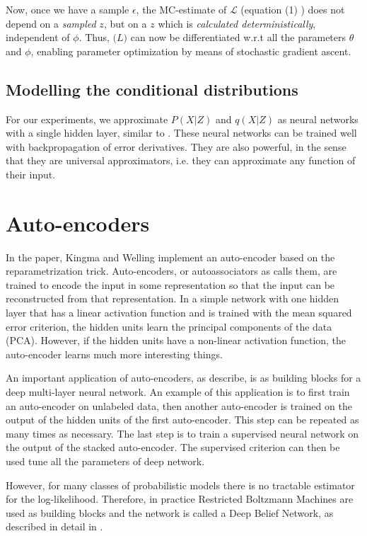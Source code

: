 \documentclass{article}
\begin{document}
Now, once we have a sample $\epsilon$, the MC-estimate of $\mathcal{L}$ (equation (1) ) does not depend on a \textit{sampled} $z$, but on a  $z$ which is \textit{calculated deterministically}, independent of $\phi$. Thus, $\mathcal(L)$ can now be differentiated w.r.t all the parameters $\theta$ and $\phi$, enabling parameter optimization by means of stochastic gradient ascent.

\subsection{Modelling the conditional distributions}
For our experiments, we approximate $P(X|Z)$ and $q(X|Z)$ as neural networks with a single hidden layer, similar to \cite{kingma2013auto}. These neural networks can be trained well with backpropagation of error derivatives. They are also powerful, in the sense that they are universal approximators, i.e. they can approximate any function of their input. 

\section{Auto-encoders}

In the paper, Kingma and Welling implement an auto-encoder based on the reparametrization trick. Auto-encoders, or autoassociators as \cite{bengio2009learning} calls them, are trained to encode the input in some representation so that the input can be reconstructed from that representation. In a simple network with one hidden layer that has a linear activation function and is trained with the mean squared error criterion, the hidden units learn the principal components of the data (PCA). However, if the hidden units have a non-linear activation function, the auto-encoder learns much more interesting things.

An important application of auto-encoders, as \cite{bengio2009learning} describe, is as building blocks for a deep multi-layer neural network. An example of this application is to first train an auto-encoder on unlabeled data, then another auto-encoder is trained on the output of the hidden units of the first auto-encoder. This step can be repeated as many times as necessary. The last step is to train a supervised neural network on the output of the stacked auto-encoder. The supervised criterion can then be used tune all the parameters of deep network. 

However, for many classes of probabilistic models there is no tractable estimator for the log-likelihood. Therefore, in practice Restricted Boltzmann Machines are used as building blocks and the network is called a Deep Belief Network, as described in detail in \cite{hinton2006reducing}.
\end{document}
